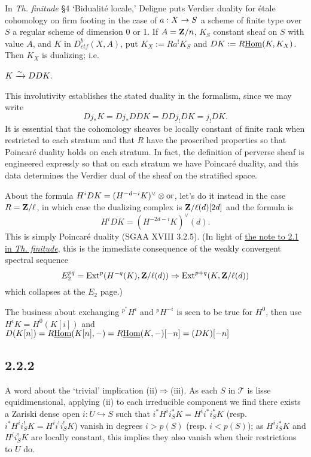 \documentclass[deligne.tex]{subfiles}
\begin{document}
	In \emph{Th. finitude} \S4 `Bidualité locale,' Deligne
	puts Verdier duality for étale cohomology on firm footing in the case of
	$a:X\rightarrow S$ a scheme of finite type over $S$ a regular scheme of 
	dimension 0 or 1.
	If $A=\mathbf{Z}/n$, $K_S$ constant sheaf on $S$ with value $A$, and $K$ in 
	$D_{ctf}^b(X,A)$, put $K_X:=Ra^!K_S$ and $DK:=R\underline{\operatorname{Hom}}(K,K_X)$.
	Then $K_X$ is dualizing; i.e.
	\begin{theorem*}[Deligne]
		$K\xrightarrow\sim DDK$.
	\end{theorem*}
	This involutivity establishes the stated duality in the formalism, since
	we may write
	\begin{equation*}
		Dj_*K=Dj_*DDK=DDj_!DK=j_!DK.
	\end{equation*}
	It is essential that the cohomology sheaves be locally
	constant of finite rank when restricted to each stratum and that $R$ 
	have the proscribed properties so that Poincaré duality holds on each 
	stratum. In fact, the definition of perverse sheaf is engineered 
	expressly so that on each stratum we have Poincaré duality, and this
	data determines the Verdier dual of the sheaf on the stratified space.
	
	About the formula $H^iDK=(H^{-d-i}K)^\vee\otimes\operatorname{or}$, let's do it
	instead in the case $R=\mathbf{Z}/\ell$, in which case the dualizing
	complex is $\mathbf{Z}/\ell(d)[2d]$ and the formula is
	\begin{equation*}
		H^iDK=(H^{-2d-i}K)^\vee(d).\tag{$\dagger$}
	\end{equation*}
	This is simply Poincaré duality (SGAA XVIII 3.2.5).
	(In light of
	\hyperref[thfin:2.1]{the note to 2.1 in \emph{Th. finitude}}, this is
	the immediate consequence of the weakly convergent spectral
	sequence
	\begin{equation*}
		E_2^{pq}=\operatorname{Ext}^p(H^{-q}(K),\mathbf{Z}/\ell(d))\Rightarrow
		\operatorname{Ext}^{p+q}(K,\mathbf{Z}/\ell(d))
	\end{equation*}	
	which collapses at the $E_2$ page.)
	
	The business about exchanging $^{p^*}H^i$ and $^pH^{-i}$ is seen to be
	true for $H^0$, then use $H^iK=H^0(K[i])$ and
	$D(K[n])=R\underline{\operatorname{Hom}}(K[n],-)=R\underline{\operatorname{Hom}}(K,-)[-n]=(DK)[-n]$
	
	\subsection*{2.2.2}
	A word about the `trivial' implication (ii)$\Rightarrow$(iii).
	As each $S$ in $\mathcal T$ is lisse equidimensional, applying (ii) to
	each irreducible component we find there exists a Zariski dense open 
	$i:U\hookrightarrow S$ such that $i^*H^ii_S^*K=H^ii^*i_S^*K$
	(resp. $i^*H^ii_S^!K=H^ii^!i_S^!K$) vanish in degrees $i>p(S)$
	(resp. $i<p(S)$); as $H^ii_S^*K$ and $H^ii_S^!K$ are locally constant,
	this implies they also vanish when their restrictions to $U$ do.
	
\end{document}
